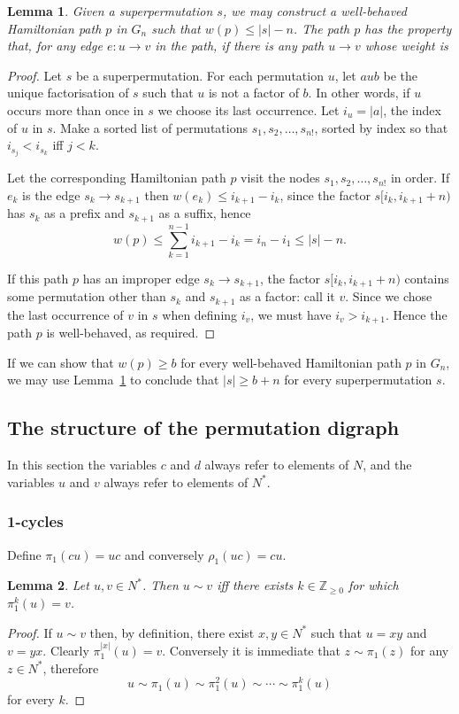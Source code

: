 \documentclass[a4paper]{article}
\newtheorem{lemma}{Lemma}
\theoremstyle{definition}
\theoremstyle{remark}
\begin{document}
\begin{lemma}\label{lemma:transfer}
    Given a superpermutation $s$, we may construct a well-behaved Hamiltonian path $p$ in $G_n$ such that $w(p) \le |s|-n$. The path $p$ has the property that, for any edge $e: u\to v$ in the path, if there is any path $u\to v$ whose weight is 
\end{lemma}
\begin{proof}
Let $s$ be a superpermutation. For each permutation $u$, let $aub$ be the unique factorisation of $s$ such that $u$ is not a factor of $b$. In other words, if $u$ occurs more than once in $s$ we choose its last occurrence. Let $i_u = |a|$, the index of $u$ in $s$. Make a sorted list of permutations $s_1, s_2, \dots, s_{n!}$, sorted by index so that $i_{s_j} < i_{s_k}$ iff $j < k$.

Let the corresponding Hamiltonian path $p$ visit the nodes $s_1, s_2, \dots, s_{n!}$ in order. If $e_k$ is the edge $s_k \to s_{k+1}$ then $w(e_k) \le i_{k+1} - i_k$, since the factor $s[i_k, i_{k+1} + n)$ has $s_k$ as a prefix and $s_{k+1}$ as a suffix, hence
\[
    w(p) \le \sum_{k=1}^{n-1} i_{k+1} - i_k = i_n - i_1 \le |s| - n.
\]

If this path $p$ has an improper edge $s_k \to s_{k+1}$, the factor $s[i_k, i_{k+1} + n)$ contains some permutation other than $s_k$ and $s_{k+1}$ as a factor: call it $v$. Since we chose the last occurrence of $v$ in $s$ when defining $i_v$, we must have $i_v > i_{k+1}$. Hence the path $p$ is well-behaved, as required.
\end{proof}

If we can show that $w(p) \ge b$ for every well-behaved Hamiltonian path $p$ in $G_n$, we may use Lemma~\ref{lemma:transfer} to conclude that $|s|\ge b+n$ for every superpermutation $s$.

\subsection{The structure of the permutation digraph}
In this section the variables $c$ and $d$ always refer to elements of $N$, and the variables $u$ and $v$ always refer to elements of $N^*$.
\subsubsection{1-cycles}
Define $\pi_1(cu) = uc$ and conversely $\rho_1(uc)=cu$.

\begin{lemma}\label{lem:pi1}
Let $u, v\in N^*$. Then $u\sim v$ iff there exists $k\in\mathbb{Z}_{\ge 0}$ for which $\pi_1^k(u)=v$.
\end{lemma}
\begin{proof}
If $u\sim v$ then, by definition, there exist $x, y\in N^*$ such that $u=xy$ and $v=yx$. Clearly $\pi_1^{|x|}(u)=v$. Conversely it is immediate that $z\sim\pi_1(z)$ for any $z\in N^*$, therefore
\[
    u \sim \pi_1(u) \sim \pi_1^2(u) \sim\cdots\sim \pi_1^k(u)
\]
for every $k$.
\end{proof}
\end{document}

